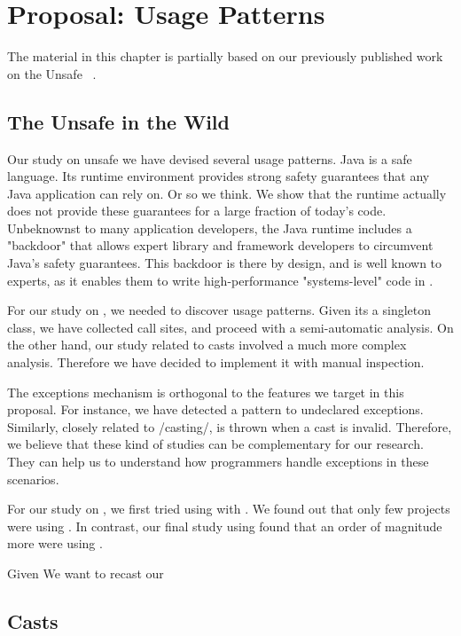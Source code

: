 
\chapter{Proposal: Usage Patterns}

\label{cha:proposal}

The material in this chapter is partially based on our previously published work on the Unsafe \api{}~\cite{mastrangeloUseYourOwn2015}.

\section{The \java{} Unsafe \api{} in the Wild}

Our study on unsafe we have devised several usage patterns.
Java is a safe language.
Its runtime environment provides strong safety guarantees that any Java application can rely on.
Or so we think.
We show that the runtime actually does not provide these guarantees for a large fraction of today's \java{} code.
Unbeknownst to many application developers, the Java runtime includes a "backdoor" that allows expert library and framework developers to circumvent Java's safety guarantees.
This backdoor is there by design, and is well known to experts, as it enables them to write high-performance "systems-level" code in \java{}.

For our study on \smu{}, we needed to discover usage patterns.
Given its a singleton class, we have collected call sites, and proceed with a semi-automatic analysis.
On the other hand, our study related to casts involved a much more complex analysis.
Therefore we have decided to implement it with manual inspection.

The exceptions mechanism is orthogonal to the features we target in this proposal.
For instance, we have detected a \smu{} pattern to \throw{} undeclared exceptions.
Similarly, closely related to /casting/, \cce{} is thrown when a cast is invalid.
Therefore, we believe that these kind of studies can be complementary for our research.
They can help us to understand how programmers handle exceptions in these scenarios.

For our study on \smu{}, we first tried using \boa{} with \sourceforge{}.
We found out that only few projects were using \smu{}.
In contrast, our final study using \maven{} found that an order of magnitude more were using \smu{}.

Given 
We want to recast our 

\section{Casts}

